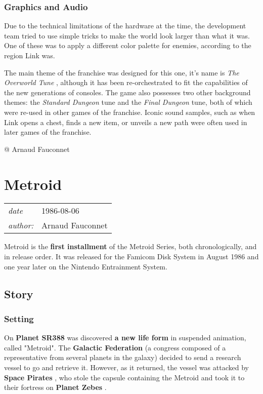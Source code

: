 \documentclass[a4paper,10pt]{book}
\newcommand{\pageHeader}[4]{
    \section{#1}
    \vspace{-0.3cm}
    \begin{table}[h!]
     \begin{tabular}{ll}
        \hline
        \textit{date} & #2 \\
        \textit{author: } & #3\\
        \hline
     \end{tabular}
    \end{table}
    \vspace{-0.3cm}
}
\begin{document}
 \subsubsection{Graphics and Audio }
 
          Due to the technical limitations of the hardware at the time, the
          development team tried to use simple tricks to make the world look
          larger than what it was. One of these was to apply a
          different color palette for enemies, according to the region Link was.
           
 
          The main theme of the franchise was designed for this one, it's name
          is  \textit{The Overworld Tune }, although it has been re-orchestrated to
          fit the capabilities of the new generations of consoles. The game also
          possesses two other background themes: the  \textit{Standard Dungeon }
          tune and the  \textit{Final Dungeon } tune, both of which were re-used in
          other games of the franchise. Iconic sound samples, such as when Link
          opens a chest, finds a new item, or unveils a new path were often used
          in later games of the franchise.
           
 
 
 @ Arnaud Fauconnet 
 
 \newpage\pageHeader{Metroid}{1986-08-06}{Arnaud Fauconnet}{Metroid is the first game of the Metroid series, both chronologically, and in release order.}
 
 Metroid is the  \textbf{first installment }  of the Metroid Series,
              both chronologically, and in release order. It was released for the
              Famicom Disk System in August 1986 and one year later on the Nintendo
              Entrainment System. 
 \subsection{Story }
 \subsubsection{Setting }
 On  \textbf{Planet
          SR388 }  was discovered  \textbf{a new life form }  in suspended animation, called
          "Metroid". The  \textbf{Galactic Federation }  (a congress composed of a
          representative from several planets in the galaxy) decided to send a
          research vessel to go and retrieve it. However, as it returned, the
          vessel was attacked by  \textbf{Space Pirates } , who stole the capsule containing
          the Metroid and took it to their fortress on  \textbf{Planet Zebes } . 
 
\end{document}
